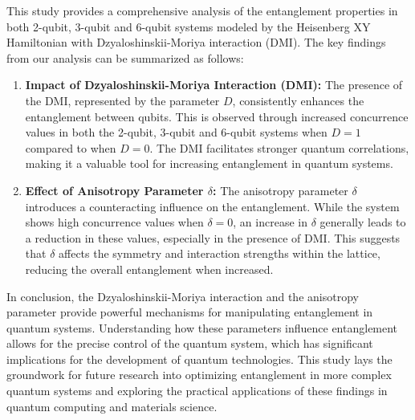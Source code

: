 This study provides a comprehensive 
analysis of the entanglement properties 
in both 2-qubit, 3-qubit and 6-qubit systems modeled 
by the Heisenberg XY Hamiltonian with 
Dzyaloshinskii-Moriya interaction (DMI). 
The key findings from our analysis 
can be summarized as follows:

\begin{enumerate}
    \item \textbf{Impact of Dzyaloshinskii-Moriya Interaction (DMI):}
    The presence of the DMI, represented by the parameter \(D\), consistently enhances the entanglement between qubits. This is observed through increased concurrence values in both the 2-qubit, 3-qubit and 
    6-qubit systems when \(D = 1\) compared to when \(D = 0\). The DMI facilitates stronger quantum correlations, making it a valuable tool for increasing entanglement in quantum systems.

    \item \textbf{Effect of Anisotropy Parameter \(\delta\):}
    The anisotropy parameter \(\delta\) introduces a counteracting influence on the entanglement. While the system shows high concurrence values when \(\delta = 0\), an increase in \(\delta\) generally leads to a reduction in these values, especially in the presence of DMI. This suggests that \(\delta\) affects the symmetry and interaction strengths within the lattice, reducing the overall entanglement when increased.

\end{enumerate}

In conclusion, the Dzyaloshinskii-Moriya interaction 
and the anisotropy parameter provide powerful 
mechanisms for manipulating entanglement in 
quantum systems. Understanding how these parameters 
influence entanglement allows for the precise control of the 
quantum system, which has significant implications for the development of quantum technologies. 
This study lays the groundwork 
for future research into optimizing 
entanglement in more complex quantum systems and exploring the practical applications of these findings in 
quantum computing and materials science.